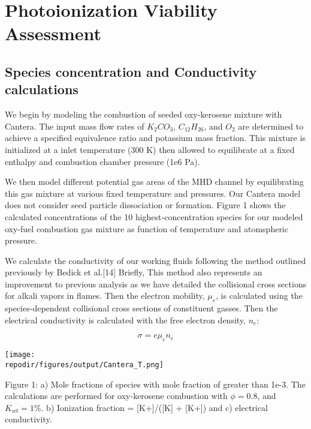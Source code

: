 
\section{Photoionization Viability Assessment}


\hypertarget{species-concentration-and-conductivity-calculations}{%
\subsection{Species concentration and Conductivity calculations}\label{species-concentration-and-conductivity-calculations}}

We begin by modeling the combustion of seeded oxy-kerosene mixture with Cantera. The input mass flow rates of $K_2CO_3$, $C_{12}H_{26}$, and $O_2$ are determined to achieve a specified equivalence ratio and potassium mass fraction. This mixture is initialized at a inlet temperature (300 K) then allowed to equilibrate at a fixed enthalpy and combustion chamber pressure (1e6 Pa).

We then model different potential gas areas of the MHD channel by equilibrating this gas mixture at various fixed temperature and pressures. Our Cantera model does not consider seed particle dissociation or formation. Figure 1 shows the calculated concentrations of the 10 highest-concentration species for our modeled oxy-fuel combustion gas mixture as function of temperature and atomspheric pressure.

We calculate the conductivity of our working fluids following the method outlined previously by Bedick et al.{[}14{]} Briefly, This method also represents an improvement to previous analysis as we have detailed the collisional cross sections for alkali vapors in flames. Then the electron mobility, \(\mu_{e}\), is calculated using the species-dependent collisional cross sections of constituent gasses. Then the electrical conductivity is calculated with the free electron density, \(n_{e}\):

\begin{equation}
\sigma = e\mu_{e}n_{e}
\end{equation}


\texttt{[image: \\repodir/figures/output/Cantera\_T.png]}

Figure 1: a) Mole fractions of species with mole fraction of greater than 1e-3. The calculations are performed for oxy-kerosene combustion with \(\phi = 0.8\), and \(K_{wt} = 1\%\). b) Ionization fraction = {[}K+{]}/({[}K{]} + {[}K+{]}) and c) electrical conductivity.


